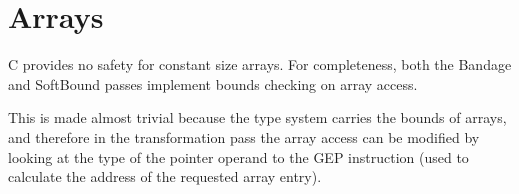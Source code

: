 %
%
%
%
%
%
%

\section{Arrays}

C provides no safety for constant size arrays.
For completeness, both the Bandage and SoftBound passes implement bounds checking on array access.

This is made almost trivial because the type system carries the bounds of arrays, and therefore in the transformation pass the array access can be modified by looking at the type of the pointer operand to the GEP instruction (used to calculate the address of the requested array entry).
